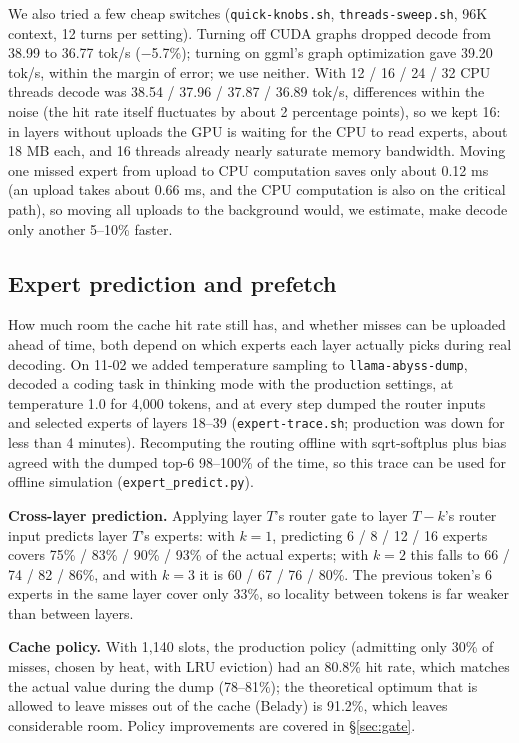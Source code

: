 \documentclass[11pt,a4paper]{article}
\newcommand{\code}[1]{\texttt{#1}}
\newcommand{\tps}{tok/s}
\begin{document}
We also tried a few cheap switches (\code{quick-knobs.sh}, \code{threads-sweep.sh}, 96K context, 12 turns per setting). Turning off CUDA graphs dropped decode from 38.99 to 36.77 \tps{} ($-$5.7\%); turning on ggml's graph optimization gave 39.20 \tps{}, within the margin of error; we use neither. With 12 / 16 / 24 / 32 CPU threads decode was 38.54 / 37.96 / 37.87 / 36.89 \tps{}, differences within the noise (the hit rate itself fluctuates by about 2 percentage points), so we kept 16: in layers without uploads the GPU is waiting for the CPU to read experts, about 18 MB each, and 16 threads already nearly saturate memory bandwidth. Moving one missed expert from upload to CPU computation saves only about 0.12 ms (an upload takes about 0.66 ms, and the CPU computation is also on the critical path), so moving all uploads to the background would, we estimate, make decode only another 5--10\% faster.

\subsection{Expert prediction and prefetch}
\label{sec:predict}

How much room the cache hit rate still has, and whether misses can be uploaded ahead of time, both depend on which experts each layer actually picks during real decoding. On 11-02 we added temperature sampling to \code{llama-abyss-dump}, decoded a coding task in thinking mode with the production settings, at temperature 1.0 for 4,000 tokens, and at every step dumped the router inputs and selected experts of layers 18--39 (\code{expert-trace.sh}; production was down for less than 4 minutes). Recomputing the routing offline with sqrt-softplus plus bias agreed with the dumped top-6 98--100\% of the time, so this trace can be used for offline simulation (\code{expert\_predict.py}).

\textbf{Cross-layer prediction.} Applying layer $T$'s router gate to layer $T-k$'s router input predicts layer $T$'s experts: with $k=1$, predicting 6 / 8 / 12 / 16 experts covers 75\% / 83\% / 90\% / 93\% of the actual experts; with $k=2$ this falls to 66 / 74 / 82 / 86\%, and with $k=3$ it is 60 / 67 / 76 / 80\%. The previous token's 6 experts in the same layer cover only 33\%, so locality between tokens is far weaker than between layers.

\textbf{Cache policy.} With 1,140 slots, the production policy (admitting only 30\% of misses, chosen by heat, with LRU eviction) had an 80.8\% hit rate, which matches the actual value during the dump (78--81\%); the theoretical optimum that is allowed to leave misses out of the cache (Belady) is 91.2\%, which leaves considerable room. Policy improvements are covered in \S\ref{sec:gate}.
\end{document}
